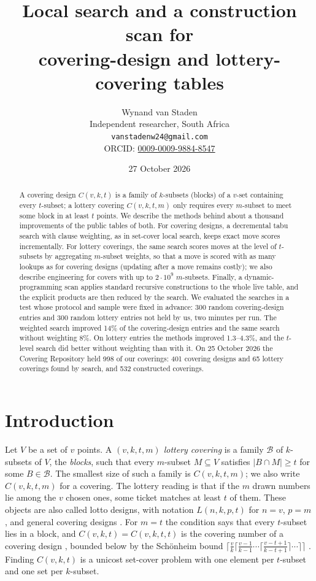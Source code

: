 \documentclass[11pt]{article}
\title{Local search and a construction scan for\\covering-design and lottery-covering tables}
\author{Wynand van Staden\\{\small Independent researcher, South Africa}\\{\small\texttt{vanstadenw24@gmail.com}}\\{\small ORCID: \href{https://orcid.org/0009-0009-9884-8547}{0009-0009-9884-8547}}}
\date{27 October 2026}
\theoremstyle{remark}
\begin{document}
\maketitle

\begin{abstract}
A covering design $C(v,k,t)$ is a family of $k$-subsets (blocks) of a $v$-set containing every $t$-subset; a lottery
covering $C(v,k,t,m)$ only requires every $m$-subset to meet some block in at least $t$ points. We describe the
methods behind about a thousand improvements of the public tables of both. For covering designs, a decremental tabu
search with clause weighting, as in set-cover local search, keeps exact move scores incrementally. For lottery
coverings, the same search scores moves at the level of $t$-subsets by aggregating $m$-subset weights, so that a move
is scored with as many lookups as for covering designs (updating after a move remains costly); we also describe engineering for covers with up to
$2\cdot 10^9$ $m$-subsets. Finally, a dynamic-programming scan applies standard recursive constructions to the whole
live table, and the explicit products are then reduced by the search. We evaluated the searches in a test whose
protocol and sample were fixed in advance: 300 random covering-design entries and 300 random lottery entries not held
by us, two minutes per run. The weighted search improved 14\% of the covering-design entries and the same search
without weighting 8\%. On lottery entries the methods improved 1.3--4.3\%,
and the $t$-level search did better without weighting than with it. On 25 October 2026 the Covering Repository held
998 of our coverings: 401 covering designs and 65 lottery coverings found by search, and 532 constructed coverings.
\end{abstract}

\section{Introduction}

Let $V$ be a set of $v$ points. A \emph{$(v,k,t,m)$ lottery covering} is a family $\mathcal{B}$ of $k$-subsets of
$V$, the \emph{blocks}, such that every $m$-subset $M\subseteq V$ satisfies $|B\cap M|\ge t$ for some
$B\in\mathcal{B}$. The smallest size of such a family is $C(v,k,t,m)$; we also write $C(v,k,t,m)$ for a covering. The
lottery reading is that if the $m$ drawn numbers lie among the $v$ chosen ones, some ticket matches at least $t$ of
them. These objects are also called lotto designs, with notation $L(n,k,p,t)$ for $n=v$, $p=m$
\cite{batevanrees1998,livanrees2002,li1999}, and general covering designs \cite{montecalvo2012}. For $m=t$ the
condition says that every $t$-subset lies in a block, and $C(v,k,t)=C(v,k,t,t)$ is the covering number of a covering
design \cite{millsmullin1992,gordonstinson2007}, bounded below by the Sch\"onheim bound
$\lceil\frac{v}{k}\lceil\frac{v-1}{k-1}\cdots\lceil\frac{v-t+1}{k-t+1}\rceil\cdots\rceil\rceil$ \cite{schonheim1964}.
Finding $C(v,k,t)$ is a unicost set-cover problem with one element per $t$-subset and one set per $k$-subset.
\end{document}
